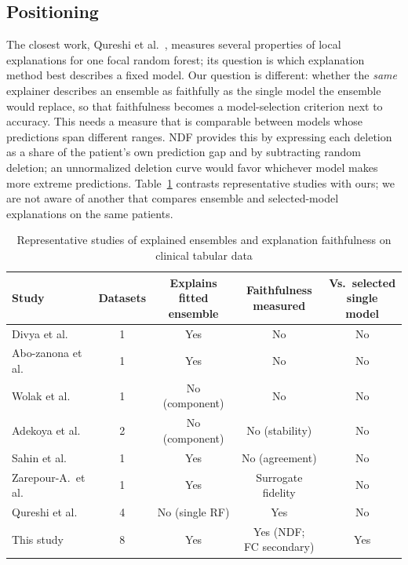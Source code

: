 \subsection{Positioning}
The closest work, Qureshi et al.\ \cite{qureshi}, measures several properties of local explanations for one focal random forest; its question is which explanation method best describes a fixed model. Our question is different: whether the \emph{same} explainer describes an ensemble as faithfully as the single model the ensemble would replace, so that faithfulness becomes a model-selection criterion next to accuracy. This needs a measure that is comparable between models whose predictions span different ranges. NDF provides this by expressing each deletion as a share of the patient's own prediction gap and by subtracting random deletion; an unnormalized deletion curve would favor whichever model makes more extreme predictions. Table~\ref{tab:rw} contrasts representative studies with ours; we are not aware of another that compares ensemble and selected-model explanations on the same patients.

\begin{table}[t]
\caption{Representative studies of explained ensembles and explanation faithfulness on clinical tabular data}
\label{tab:rw}
\centering\scriptsize
\setlength{\tabcolsep}{3pt}
\begin{tabular}{@{}lcccc@{}}
\toprule
Study & Datasets & \makecell{Explains fitted\\ ensemble} & \makecell{Faithfulness\\ measured} & \makecell{Vs.\ selected\\ single model} \\
\midrule
Divya et al.\ \cite{divya} & 1 & Yes & No & No \\
Abo-zanona et al.\ \cite{abozanona} & 1 & Yes & No & No \\
Wolak et al.\ \cite{wolak} & 1 & No (component) & No & No \\
Adekoya et al.\ \cite{adekoya} & 2 & No (component) & No (stability) & No \\
Sahin et al.\ \cite{sahin} & 1 & Yes & No (agreement) & No \\
Zarepour-A.\ et al.\ \cite{zarepour} & 1 & Yes & Surrogate fidelity & No \\
Qureshi et al.\ \cite{qureshi} & 4 & No (single RF) & Yes & No \\
\midrule
This study & 8 & Yes & \makecell{Yes (NDF;\\ FC secondary)} & Yes \\
\bottomrule
\end{tabular}
\end{table}
